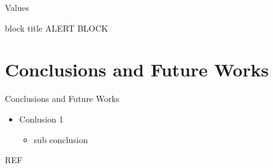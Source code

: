 \documentclass{beamer}
\begin{document}
	\begin{frame}{Values}
	\begin{alertblock}{block title}
ALERT BLOCK
	\end{alertblock}
\end{frame}
	\section{Conclusions and Future Works}
	
	\begin{frame}{Conclusions and Future Works}
\begin{itemize}
	\item Conlusion 1
	\begin{itemize}
		\item sub conclusion
	\end{itemize}
\end{itemize}
\end{frame}

\begin{frame}{REF}
%
%
\printbibliography
\end{frame}
\end{document}
